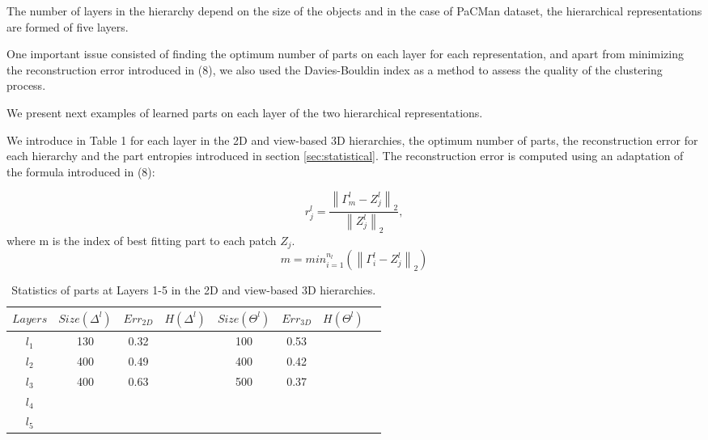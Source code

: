 \documentclass[runningheads]{llncs}
\begin{document}
The number of layers in the hierarchy depend on the size of the objects and in the case of PaCMan dataset, the hierarchical representations are formed of five layers. 

One important issue consisted of finding the optimum number of parts on each layer for each representation, and apart from minimizing the reconstruction error introduced in (8), we also used the Davies-Bouldin index \cite{Bouldin97} as a method to assess the quality of the clustering process.

We present next examples of learned parts on each layer of the two hierarchical representations.

We introduce in Table 1 for each layer in the 2D and view-based 3D hierarchies, the optimum number of parts, the reconstruction error for each hierarchy and the part entropies introduced in section \ref{sec:statistical}. The reconstruction error is computed using an adaptation of the formula introduced in (8):

\begin{equation}
 r_j^l = \frac{\left\|\Gamma_m^l-Z_j^l\right\|_2}{\left\|Z_j^l\right\|_2}, \end{equation}
 where m is the index of best fitting part to each patch $Z_j$.
\begin{equation}
 m=min_{i=1}^{n_l}(\left\|\Gamma_i^l-Z_j^l\right\|_2)
\end{equation}

 \begin{table}
 \begin{center}
  \begin{tabular}{ | c | c | c | c | c | c | c |r |}
      \hline
      $Layers$  & $Size(\Delta^l)$ & $Err_{2D}$ & $H(\Delta^l)$ &  $Size(\Theta^l)$ & $Err_{3D}$ & $H(\Theta^l)$  \\ \hline
    $l_1$ &  130  & 0.32 &  & 100 & 0.53 &  \\ \hline
    $l_2$ &  400 & 0.49 &  & 400 & 0.42 &  \\ \hline
    $l_3$ &  400 & 0.63 &   & 500 & 0.37 &  \\ \hline 
    $l_4$ &   &  &   &  &  &  \\ \hline
    $l_5$ &   &  &  &  &  &  \\ 
    \hline
  \end{tabular}
\end{center}
\caption{Statistics of parts at Layers 1-5 in the 2D and view-based 3D hierarchies.}
\end{table}
\end{document}
